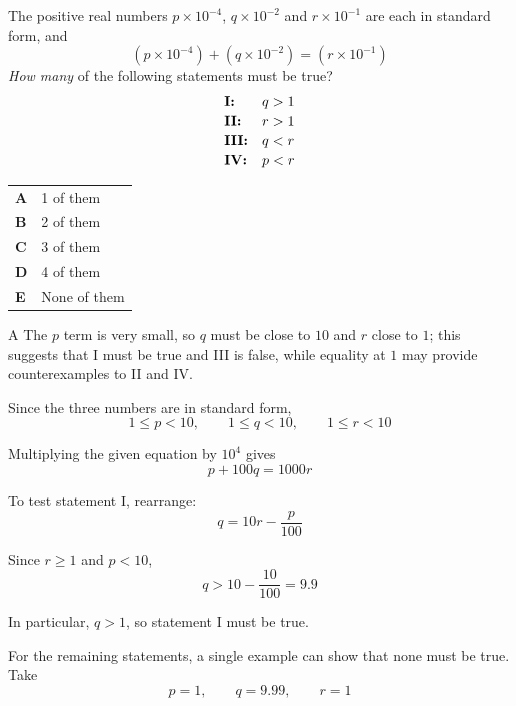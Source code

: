 \documentclass[11pt,a4paper]{article}
\begin{document}
\begin{enumerate}[label=\textbf{\arabic*.},leftmargin=*,itemsep=0pt,start=12]
\questionitem[Number]
The positive real numbers $p \times 10^{-4}$, $q \times 10^{-2}$ and $r \times 10^{-1}$ are each in standard form, and \[ (p \times 10^{-4}) + (q \times 10^{-2}) = (r \times 10^{-1}) \] \textit{How many} of the following statements must be true? \[ \begin{array}{@{}l l@{}}
\textbf{I:} & \text{$q>1$} \\[2pt]
\textbf{II:} & \text{$r>1$} \\[2pt]
\textbf{III:} & \text{$q<r$} \\[2pt]
\textbf{IV:} & \text{$p<r$}
\end{array} \]

\par\vspace*{12pt}
\begin{tabularx}{\linewidth}{@{}>{\bfseries}l Y@{}}
A &
1 of them
\\[0.8em]
B &
2 of them
\\[0.8em]
C &
3 of them
\\[0.8em]
D &
4 of them
\\[0.8em]
E &
None of them
\\
\end{tabularx}

\begin{djsSolution}{A}
The $p$ term is very small, so $q$ must be close to $10$ and $r$ close to $1$; this suggests that I must be true and III is false, while equality at $1$ may provide counterexamples to II and IV.

Since the three numbers are in standard form,
\[
1\leq p<10,\qquad 1\leq q<10,\qquad 1\leq r<10
\]

Multiplying the given equation by $10^4$ gives
\[
p+100q=1000r
\]

To test statement I, rearrange:
\[
q=10r-\frac{p}{100}
\]

Since $r\geq1$ and $p<10$,
\[
q>10-\frac{10}{100}=9.9
\]

In particular, $q>1$, so statement I must be true.

For the remaining statements, a single example can show that none must be true. Take
\[
p=1,\qquad q=9.99,\qquad r=1
\]


\end{djsSolution}
\end{enumerate}
\end{document}
